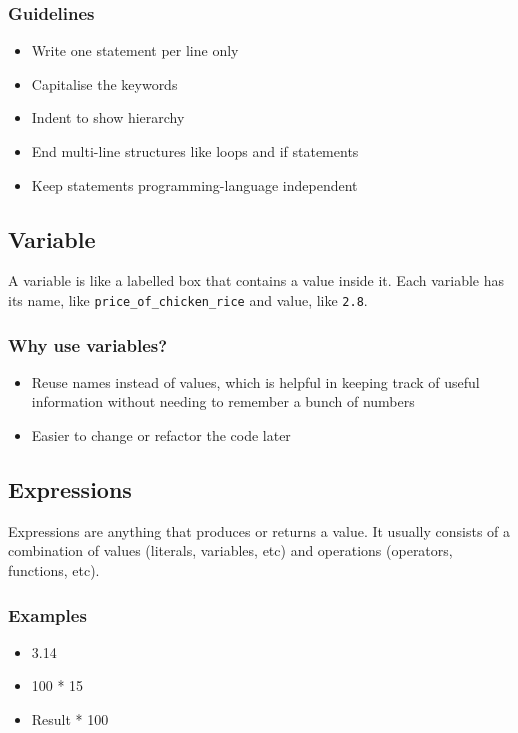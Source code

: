 \documentclass[11pt]{article}
\begin{document}
\subsubsection{Guidelines}
\label{sec:org9d89239}
\begin{itemize}
\item Write one statement per line only
\item Capitalise the keywords
\item Indent to show hierarchy
\item End multi-line structures like loops and if statements
\item Keep statements programming-language independent
\end{itemize}

\subsection{Variable}
\label{sec:org3f247fd}
A variable is like a labelled box that contains a value inside it. Each variable has its name, like \texttt{price\_of\_chicken\_rice} and value, like \texttt{2.8}.

\subsubsection{Why use variables?}
\label{sec:org8167f06}
\begin{itemize}
\item Reuse names instead of values, which is helpful in keeping track of useful information without needing to remember a bunch of numbers
\item Easier to change or refactor the code later
\end{itemize}

\subsection{Expressions}
\label{sec:orgb638b7c}
Expressions are anything that produces or returns a value. It usually consists of a combination of values (literals, variables, etc) and operations (operators, functions, etc).

\subsubsection{Examples}
\label{sec:orge6044e5}
\begin{itemize}
\item 3.14
\item 100 * 15
\item Result * 100
\end{itemize}
\end{document}
